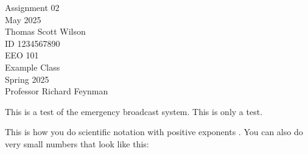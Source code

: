 \documentclass[11pt]{article}
\begin{document}
    \raggedright
    \thispagestyle{plain}
    \setlength{\jot}{3ex}

    \begin{titlepage}

        \centering
        \vspace*{\baselineskip}
        Assignment 02\\
         May 2025\\
        \vfill
        Thomas Scott Wilson\\
        \medskip
        ID 1234567890 \\
        \vfill
        EEO 101\\
        \medskip
        Example Class\\
        \medskip
        Spring 2025 \\
        \medskip
        Professor Richard Feynman \\
        \vfill

    \end{titlepage}


    \newpage
    \pagestyle{fancy}
    This is a test of the emergency broadcast system.
    This is only a test.

    This is how you do scientific notation with positive exponents .
    You can also do very small numbers that look like this: 
\end{document}
